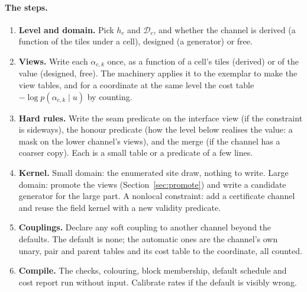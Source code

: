 \documentclass[11pt]{article}
\newcommand{\1}{\mathds{1}}
\newcommand{\Dom}{\mathcal{D}}
\begin{document}
\paragraph{The steps.}
\begin{enumerate}
  \item \textbf{Level and domain.} Pick $h_c$ and $\Dom_c$, and whether the channel is
        derived (a function of the tiles under a cell), designed (a generator)
        or free.
  \item \textbf{Views.} Write each $\alpha_{c,k}$ once, as a function of a cell's
        tiles (derived) or of the value (designed, free). The machinery applies
        it to the exemplar to make the view tables, and for a coordinate at the
        same level the cost table $-\log p(\alpha_{c,k} \mid u)$ by counting.
  \item \textbf{Hard rules.} Write the seam predicate on the interface view (if the
        constraint is sideways), the honour predicate (how the level below
        realises the value: a mask on the lower channel's views), and the merge
        (if the channel has a coarser copy). Each is a small table or a
        predicate of a few lines.
  \item \textbf{Kernel.} Small domain: the enumerated site draw, nothing to write.
        Large domain: promote the views (Section~\ref{sec:promote}) and write a
        candidate generator for the large part. A nonlocal constraint: add a
        certificate channel and reuse the field kernel with a new validity
        predicate.
  \item \textbf{Couplings.} Declare any soft coupling to another channel beyond the
        defaults. The default is none; the automatic ones are the channel's own
        unary, pair and parent tables and its cost table to the coordinate, all
        counted.
  \item \textbf{Compile.} The checks, colouring, block membership, default schedule
        and cost report run without input. Calibrate rates if the default is
        visibly wrong.
\end{enumerate}
\end{document}
